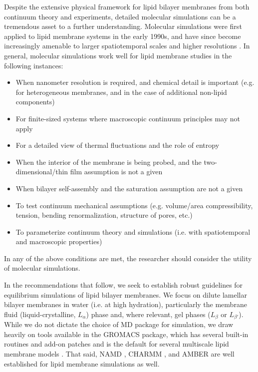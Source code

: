 \documentclass[9pt,bestpractices]{livecoms}
\begin{document}
Despite the extensive physical framework for lipid bilayer membranes from both continuum theory and experiments, detailed molecular simulations can be a tremendous asset to a further understanding.
Molecular simulations were first applied to lipid membrane systems in the early 1990s, and have since become increasingly amenable to larger spatiotemporal scales and higher resolutions \cite{Venable2015}.
In general, molecular simulations work well for lipid membrane studies in the following instances:
\begin{itemize}
	\item When nanometer resolution is required, and chemical detail is important (e.g. for heterogeneous membranes, and in the case of additional non-lipid components)
	\item For finite-sized systems where macroscopic continuum principles may not apply
	\item For a detailed view of thermal fluctuations and the role of entropy
	\item When the interior of the membrane is being probed, and the two-dimensional/thin film assumption is not a given
	\item When bilayer self-assembly and the saturation assumption are not a given
	\item To test continuum mechanical assumptions (e.g. volume/area compressibility, tension, bending renormalization, structure of pores, etc.)
	\item To parameterize continuum theory and simulations (i.e. with spatiotemporal and macroscopic properties)
\end{itemize}

In any of the above conditions are met, the researcher should consider the utility of molecular simulations.

In the recommendations that follow, we seek to establish robust guidelines for equilibrium simulations of lipid bilayer membranes.
We focus on dilute lamellar bilayer membranes in water (i.e. at high hydration), particularly the membrane fluid (liquid-crystalline, $L_\alpha$) phase and, where relevant, gel phases ($L_\beta$ or $L_{\beta '}$).
While we do not dictate the choice of MD package for simulation, we draw heavily on tools available in the GROMACS package, which has several built-in routines and add-on patches \cite{Buchoux2017,Lukat2013,Truhlar2009a} and is the default for several multiscale lipid membrane models \cite{Poger2010a,Jambeck2012,Marrink2004,Marrink2007a,Arnarez2014}.
That said, NAMD \cite{Phillips2005}, CHARMM \cite{Gumbart2007}, and AMBER \cite{Case2018} are well established for lipid membrane simulations as well.
\end{document}
